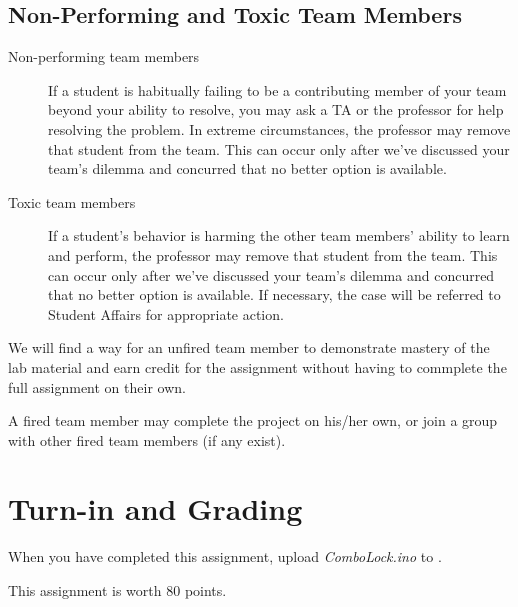 \subsection*{Non-Performing and Toxic Team Members}

\begin{description}
\item[Non-performing team members] If a student is habitually failing to be a
contributing member of your team beyond your ability to resolve, you may
ask a TA or the professor for help resolving the problem.  In extreme
circumstances, the professor may remove that student from the team.  This
can occur only after we've discussed your team's dilemma and concurred
that no better option is available.
\item [Toxic team members] If a student's behavior is harming the other team
members' ability to learn and perform, the professor may remove that
student from the team.  This can occur only after we've discussed your
team's dilemma and concurred that no better option is available. If necessary,
the case will be referred to Student Affairs for appropriate action.
\end{description}

We will find a way for an unfired team member to demonstrate mastery of the
lab material and earn credit for the assignment without having to commplete the
full assignment on their own.

A fired team member may complete the project on his/her own, or join a group
with other fired team members (if any exist).

\section*{Turn-in and Grading}

When you have completed this assignment, upload \textit{ComboLock.ino} to
\filesubmission.

This assignment is worth 80 points. \\

